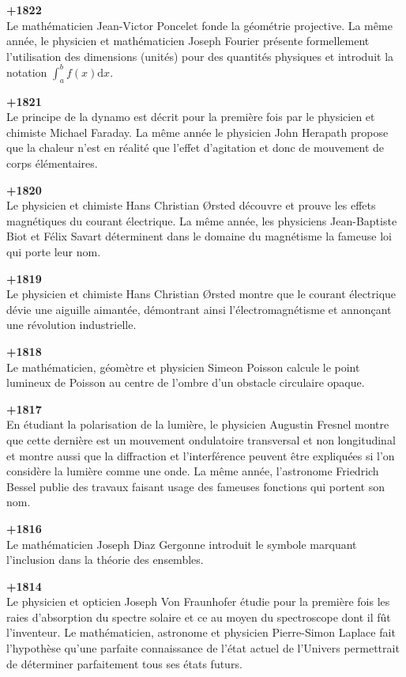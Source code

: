 \textbf{+1822}\\
Le mathématicien Jean-Victor Poncelet fonde la géométrie projective. La même année, le physicien et mathématicien Joseph Fourier présente formellement l'utilisation des dimensions (unités) pour des quantités physiques et introduit la notation $\int_a^bf(x)\mathrm{d}x$.

\textbf{+1821}\\
Le principe de la dynamo est décrit pour la première fois par le physicien et chimiste Michael Faraday. La même année le physicien John Herapath propose que la chaleur n'est en réalité que l'effet d'agitation et donc de mouvement de corps élémentaires.

\textbf{+1820}\\
Le physicien et chimiste Hans Christian Ørsted découvre et prouve les effets magnétiques du courant électrique. La même année, les physiciens Jean-Baptiste Biot et Félix Savart déterminent dans le domaine du magnétisme la fameuse loi qui porte leur nom.

\textbf{+1819}\\
Le physicien et chimiste Hans Christian Ørsted montre que le courant électrique dévie une aiguille aimantée, démontrant ainsi l'électromagnétisme et annonçant une révolution industrielle.

\textbf{+1818}\\
Le mathématicien, géomètre et physicien Simeon Poisson calcule le point lumineux de Poisson au centre de l'ombre d'un obstacle circulaire opaque.

\textbf{+1817}\\
En étudiant la polarisation de la lumière, le physicien Augustin Fresnel montre que cette dernière est un mouvement ondulatoire transversal et non longitudinal et montre aussi que la diffraction et l'interférence peuvent être expliquées si l'on considère la lumière comme une onde. La même année, l'astronome Friedrich Bessel publie des travaux faisant usage des fameuses fonctions qui portent son nom.

\textbf{+1816}\\
Le mathématicien Joseph Diaz Gergonne introduit le symbole marquant l'inclusion dans la théorie des ensembles.

\textbf{+1814}\\
Le physicien et opticien Joseph Von Fraunhofer étudie pour la première fois les raies d'absorption du spectre solaire et ce au moyen du spectroscope dont il fût l'inventeur. Le mathématicien, astronome et physicien Pierre-Simon Laplace fait l'hypothèse qu'une parfaite connaissance de l'état actuel de l'Univers permettrait de déterminer parfaitement tous ses états futurs.

